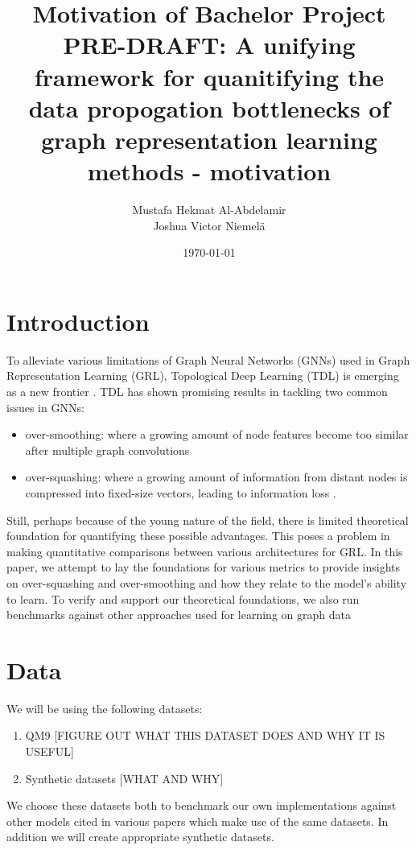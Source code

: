 \documentclass[a4paper,12pt]{article}
\title{Motivation of Bachelor Project PRE-DRAFT: A unifying framework for quanitifying the data propogation bottlenecks of graph representation learning methods - motivation}
\author{
	\color{red}  Mustafa Hekmat Al-Abdelamir\\
	\color{red}  Joshua Victor Niemelä\\
}
\date{\today}
\begin{document}
\maketitle



\section{Introduction}
To alleviate various limitations of Graph Neural Networks (GNNs) used in Graph Representation Learning (GRL), Topological Deep Learning \cite{papamarkou_position:_2024} (TDL) is emerging as a new frontier \cite{papamarkou_position:_2024}.
TDL has shown promising results in tackling two common issues in GNNs:
\begin{itemize}
	\item over-smoothing: where a growing amount of node features become too similar after multiple graph convolutions \cite{li_deeper_2018}
	\item over-squashing: where a growing amount of information from distant nodes is compressed into fixed-size vectors, leading to information loss \cite{alon_bottleneck_2021}.
\end{itemize}

Still, perhaps because of the young nature of the field, there is limited theoretical foundation for quantifying these possible advantages. This poses a problem in making quantitative comparisons between various architectures for GRL. In this paper, we attempt to lay the foundations for various metrics to provide insights on over-squashing and over-smoothing and how they relate to the model's ability to learn. To verify and support our theoretical foundations, we also run benchmarks against other approaches used for learning on graph data \cite{horn_topological_2022}

\section{Data}
We will be using the following datasets:
\begin{enumerate}
	\item QM9 [FIGURE OUT WHAT THIS DATASET DOES AND WHY IT IS USEFUL]
	\item Synthetic datasets [WHAT AND WHY]
\end{enumerate}
We choose these datasets both to benchmark our own implementations against other models cited in various papers which make use of the same datasets. In addition we will create appropriate synthetic datasets.
\end{document}
